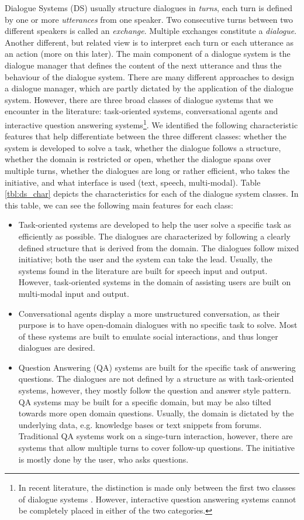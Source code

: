 Dialogue Systems (DS) usually structure dialogues in \emph{turns}, each turn is defined by one or more \emph{utterances} from one speaker. Two consecutive turns between two different speakers is called an \emph{exchange}. Multiple exchanges constitute a \emph{dialogue}. Another different, but related view is to interpret each turn or each utterance as an action (more on this later). 
The main component of a dialogue system is the dialogue manager that defines the content of the next utterance and thus the behaviour of the dialogue system. There are many different approaches to design a dialogue manager, which are partly dictated by the application of the dialogue system. However, there are three broad classes of dialogue systems that we encounter in the literature: task-oriented systems, conversational agents and interactive question answering systems\footnote{In recent literature, the distinction is made only between the first two classes of dialogue systems . However, interactive question answering systems cannot be completely placed in either of the two categories. }. 
We identified the following characteristic features that help differentiate between the three different classes: whether the system is developed to solve a task, whether the dialogue follows a structure, whether the domain is restricted or open, whether the dialogue spans over multiple turns, whether the dialogues are long or rather efficient, who takes the initiative, and what interface is used (text, speech, multi-modal). Table \ref{tbl:ds_char} depicts the characteristics for each of the dialogue system classes. In this table, we can see the following main features for each class:
    \begin{itemize}
    \item Task-oriented systems are developed to help the user solve a specific task as efficiently as possible. The dialogues are characterized by following a clearly defined structure that is derived from the domain. The dialogues follow mixed initiative; both the user and the system can take the lead. Usually, the systems found in the literature are built for speech input and output. However, task-oriented systems in the domain of assisting users are built on multi-modal input and output. 
    \item Conversational agents display a more unstructured conversation, as their purpose is to have open-domain dialogues with no specific task to solve. Most of these systems are built to emulate social interactions, and thus longer dialogues are desired.
    \item Question Answering (QA) systems are built for the specific task of answering questions. The dialogues are not defined by a structure as with task-oriented systems, however, they mostly follow the question and answer style pattern. QA systems may be built for a specific domain, but may be also tilted towards more open domain questions. Usually, the domain is dictated by the underlying data, e.g. knowledge bases or text snippets from forums. Traditional QA systems work on a singe-turn interaction, however, there are systems that allow multiple turns to cover follow-up questions. The initiative is mostly done by the user, who asks questions. 
    \end{itemize}
